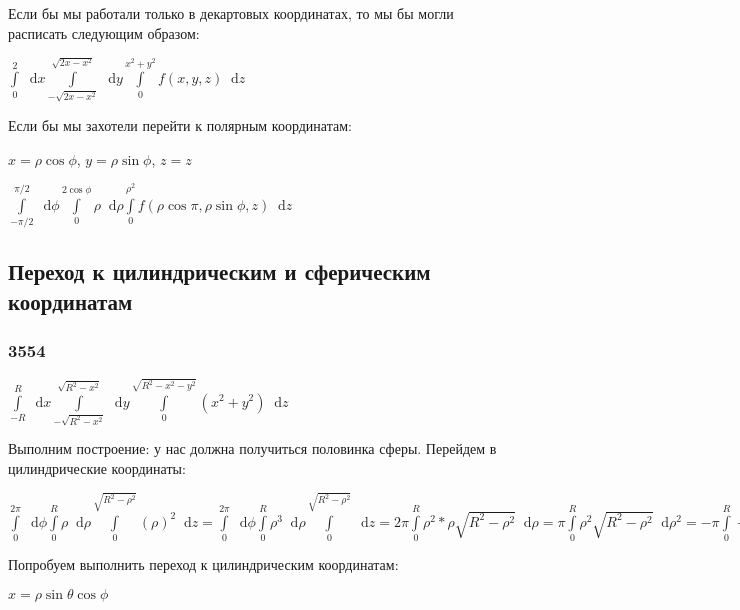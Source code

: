 \documentclass{article}
\newcommand*\diff{\mathop{}\!\mathrm{d}}
\begin{document}
Если бы мы работали только в декартовых координатах, то мы бы могли расписать следующим образом:

$\int\limits_{0}^{2} \diff x \int\limits_{-\sqrt{2x-x^2}}^{\sqrt{2x-x^2}} \diff y \int\limits_{0}^{x^2+y^2} f(x, y, z) \diff z$

Если бы мы захотели перейти к полярным координатам:

$x = \rho \cos \phi$, $y = \rho \sin \phi$, $z = z$

$\int\limits_{-\pi/2}^{\pi/2} \diff \phi \int\limits_{0}^{2 \cos \phi} \rho \diff \rho \int\limits_{0}^{\rho^2} f(\rho \cos \pi, \rho \sin \phi, z) \diff z$

\pagebreak
\subsection{Переход к цилиндрическим и сферическим координатам}

\subsubsection{3554}

$\int\limits_{-R}^{R} \diff x \int\limits_{-\sqrt{R^2-x^2}}^{\sqrt{R^2-x^2}} \diff y \int\limits_{0}^{\sqrt{R^2-x^2-y^2}} (x^2 + y^2) \diff z$

Выполним построение: у нас должна получиться половинка сферы. Перейдем в цилиндрические координаты:

$
\int\limits_{0}^{2\pi} \diff \phi \int\limits_{0}^{R} \rho \diff \rho \int\limits_{0}^{\sqrt{R^2-\rho^2}} (\rho)^2 \diff z =
\int\limits_{0}^{2\pi} \diff \phi \int\limits_{0}^{R} \rho^3 \diff \rho \int\limits_{0}^{\sqrt{R^2-\rho^2}} \diff z = 2 \pi \int\limits_{0}^{R} \rho^2 * \rho \sqrt{R^2 - \rho^2} \diff \rho = \pi \int\limits_{0}^{R} \rho^2 \sqrt{R^2 - \rho^2} \diff \rho^2
= -\pi \int\limits_{0}^{R} -\rho^2+R^2-R^2 \sqrt{R^2 - \rho^2} \diff \rho^2 =
-\pi \int\limits (-\rho^2 + R^2) \sqrt{R^2 - \rho^2} \diff \rho^2 + \pi R^2 \int \sqrt{R^2 - \rho^2} \diff \rho^2
= \pi \int (-\rho^2 + R^2) \diff (R^2 - \rho^2) - \pi R^2 \int \sqrt{R^2 - \rho^2} \diff (R^2 - \rho^2)
= 2 \pi (\frac{(R^2 - \rho^2)}{5})^{5/2} - 2 \pi R^2 ()\frac{(R^2 - \rho^2)}{3})^{3/2} \bigg|_{0}^{R} = - \frac{2 \pi R^{2}}{5}^{5/8} + \frac{2 \pi R^2}{3}^{3/8} = 2 \pi R^{5} (\frac{1}{3} - \frac{1}{5})
$

Попробуем выполнить переход к цилиндрическим координатам:

$x = \rho \sin \theta \cos \phi$
\end{document}
